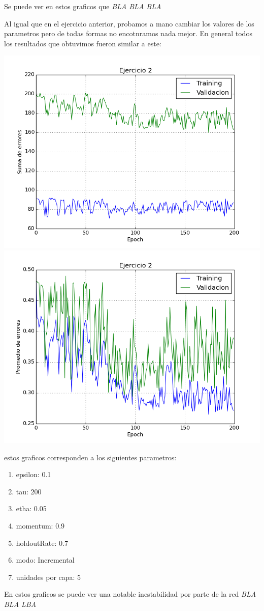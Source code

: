 Se puede ver en estos graficos que \emph{\color{red} BLA BLA BLA}

Al igual que en el ejercicio anterior, probamos a mano cambiar los valores de los parametros pero de todas formas no encotnramos nada mejor. En general todos los resultados que obtuvimos fueron similar a este:

\includegraphics[scale=0.4]{img/ej20050915sum}
\includegraphics[scale=0.4]{img/ej20050915mean}

estos graficos corresponden a los siguientes parametros:

\begin{enumerate}
\item epsilon: 0.1
\item tau: 200
\item etha: 0.05
\item momentum: 0.9
\item holdoutRate: 0.7
\item modo: Incremental
\item unidades por capa: 5
\end{enumerate}
En estos graficos se puede ver una notable inestabilidad por parte de la red \emph{\color{red} BLA BLA LBA}

